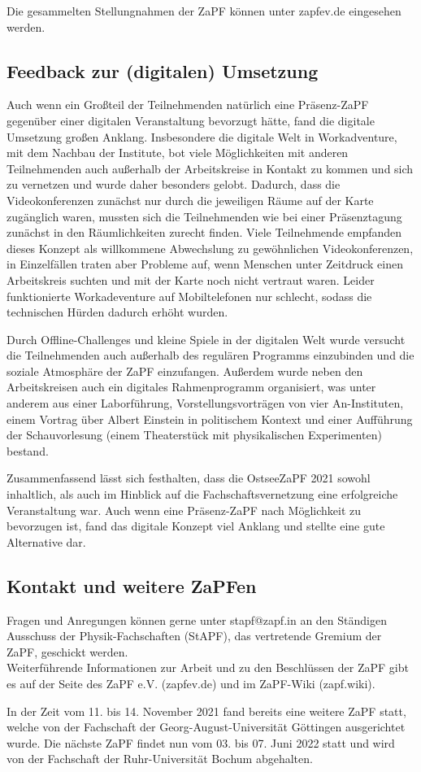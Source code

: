 \documentclass[a4paper, 11pt]{scrartcl}
\begin{document}
Die gesammelten Stellungnahmen der ZaPF können unter zapfev.de eingesehen werden.

\subsection*{Feedback zur (digitalen) Umsetzung}

Auch wenn ein Großteil der Teilnehmenden natürlich eine Präsenz-ZaPF gegenüber einer digitalen Veranstaltung bevorzugt hätte, fand die digitale Umsetzung großen Anklang. Insbesondere die digitale Welt in Workadventure, mit dem Nachbau der Institute, bot viele Möglichkeiten mit anderen Teilnehmenden auch außerhalb der Arbeitskreise in Kontakt zu kommen und sich zu vernetzen und wurde daher besonders gelobt. Dadurch, dass die Videokonferenzen zunächst nur durch die jeweiligen Räume auf der Karte zugänglich waren, mussten sich die Teilnehmenden wie bei einer Präsenztagung zunächst in den Räumlichkeiten zurecht finden. Viele Teilnehmende empfanden dieses Konzept als willkommene Abwechslung zu gewöhnlichen Videokonferenzen, in Einzelfällen traten aber Probleme auf, wenn Menschen unter Zeitdruck einen Arbeitskreis suchten und mit der Karte noch nicht vertraut waren. Leider funktionierte Workadeventure auf Mobiltelefonen nur schlecht, sodass die technischen Hürden dadurch erhöht wurden.

Durch Offline-Challenges und kleine Spiele in der digitalen Welt wurde versucht die Teilnehmenden auch außerhalb des regulären Programms einzubinden und die soziale Atmosphäre der ZaPF einzufangen. Außerdem wurde neben den Arbeitskreisen auch ein digitales Rahmenprogramm organisiert, was unter anderem aus einer Laborführung, Vorstellungsvorträgen von vier An-Instituten, einem Vortrag über Albert Einstein in politischem Kontext und einer Aufführung der Schauvorlesung (einem Theaterstück mit physikalischen Experimenten) bestand.

Zusammenfassend lässt sich festhalten, dass die OstseeZaPF 2021 sowohl inhaltlich, als auch im Hinblick auf die Fachschaftsvernetzung eine erfolgreiche Veranstaltung war. Auch wenn eine Präsenz-ZaPF nach Möglichkeit zu bevorzugen ist, fand das digitale Konzept viel Anklang und stellte eine gute Alternative dar.

\subsection*{Kontakt und weitere ZaPFen}

Fragen und Anregungen können gerne unter stapf@zapf.in an den Ständigen Ausschuss der Physik-Fachschaften (StAPF), das vertretende Gremium der ZaPF, geschickt werden.\\
Weiterführende Informationen zur Arbeit und zu den Beschlüssen der ZaPF gibt es auf der Seite des ZaPF e.V. (zapfev.de) und im ZaPF-Wiki (zapf.wiki).

In der Zeit vom 11. bis 14. November 2021 fand bereits eine weitere ZaPF statt, welche von der Fachschaft der Georg-August-Universität Göttingen ausgerichtet wurde. Die nächste ZaPF findet nun vom 03. bis 07. Juni 2022 statt und wird von der Fachschaft der Ruhr-Universität Bochum abgehalten.
\end{document}
